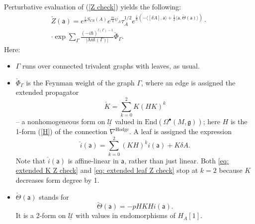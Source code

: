 \documentclass[11pt,a4paper]{amsart}
\theoremstyle{plain} %
\theoremstyle{definition}
\theoremstyle{remark}
\newcommand{\g}{\mathfrak{g}}
\newcommand{\mr}{\mathrm}
\newcommand{\sfa}{\mathsf{a}}
\newcommand{\bt}{\bullet}
\newcommand{\mc}{\mathcal}
\newcommand{\UU}{\underline{\mc{U}}}
\begin{document}
{Perturbative evaluation of (\ref{Z check}) yields the following:
\begin{multline}\label{Z check perturbative}
    \check{Z}(\sfa)=e^{\frac{i}{\hbar}S_{CS}(A)} e^{\frac{\pi i}{4}\psi_A}\tau_A^{1/2}
    e^{\frac{i}{\hbar} (-\langle [\delta A],\sfa \rangle
    +\frac12\langle \sfa, \check\Theta(\sfa)\rangle)}\cdot \\
    \cdot \exp \sum_\Gamma \frac{(-i\hbar)^{l(\Gamma)-1}}{|\mr{Aut}(\Gamma)|}\check\Phi_\Gamma.
\end{multline}
Here:
\begin{itemize}
    \item $\Gamma$ runs over connected trivalent graphs with leaves, as usual.
    \item $\check\Phi_\Gamma$ is the Feynman weight of the graph $\Gamma$, where an edge is assigned the extended propagator
    \begin{equation}\label{eq: extended K Z check}
        \check{K}=\sum_{k=0}^2 K(HK)^k %
    \end{equation}
    -- a nonhomogeneous form on $\UU$ valued in $\mr{End}(\Omega^\bt(M,\g))$;
    here $H$ is the 1-form (\ref{H}) of the connection $\nabla^\mr{Hodge}$.
    A leaf is assigned the expression
    \begin{equation}\label{eq: extended leaf Z check}
        \check{i}(\sfa)=\sum_{k= 0}^2 (KH)^k i(\sfa)+K\delta A. 
    \end{equation}
    Note that $\check{i}(\sfa)$ is affine-linear in $\sfa$, rather than just linear. Both \eqref{eq: extended K Z check} and \eqref{eq: extended leaf Z check} stop at $k=2$ because $K$ decreases form degree by 1. 
    \item $\check\Theta(\sfa)$ stands for
    \begin{equation}
        \check\Theta(\sfa)=
       -p H K H i(\sfa).
    \end{equation}
    It is a 2-form on $\UU$ with values in endomorphisms of $H_A[1]$. %
\end{itemize}
}
\end{document}
